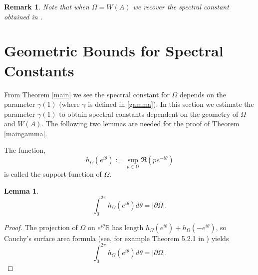 \documentclass{article}
\newtheorem{Lemma}[Theorem]{Lemma}
\newtheorem{Remark}[Theorem]{Remark}
\begin{document}
\begin{Remark}
Note that when $\Omega = W(A)$ we recover the spectral constant obtained in \cite{malman2024double}.
\end{Remark}


\section{Geometric Bounds for Spectral Constants}\label{3}
From Theorem \ref{main} we see the spectral constant for $\Omega$ depends on the parameter $\gamma(1)$ (where $\gamma$ is defined in \eqref{gamma}). In this section we estimate the parameter $\gamma(1)$ to obtain spectral constants dependent on the geometry of $\Omega$ and $W(A)$. The following two lemmas are needed for the proof of Theorem \ref{maingamma}.

The function,
$$
h_{\Omega}(e^{i \theta}) := \sup_{p \in \Omega} \Re(pe^{-i \theta})
$$
is called the support function of $\Omega$.

\begin{Lemma}\label{per}
$$
\int_0^{2 \pi} h_{\Omega}( e ^{i \theta}) d \theta = |\partial \Omega|.
$$
\end{Lemma}
\begin{proof}
The projection of $\Omega$ on $e^{i \theta} \mathbb{R}$ has length $h_{\Omega}( e ^{i \theta})  + h_{\Omega}( -e ^{i \theta})$, so Cauchy's surface area formula (see, for example Theorem 5.2.1 in \cite{Schneider2014}) yields \begin{equation}\label{perimetersupport}
        \int_0^{2 \pi}  h_{\Omega}(e^{ i \theta})  d \theta = |\partial \Omega|.
    \end{equation}
\end{proof}
\end{document}
